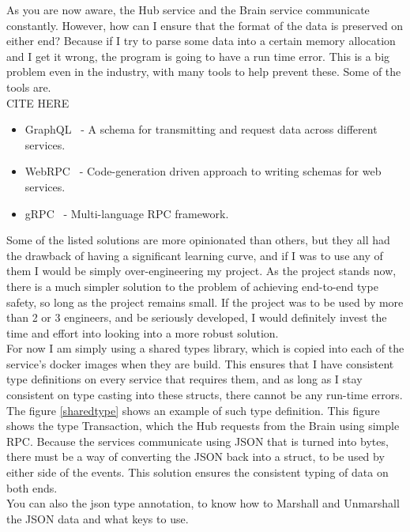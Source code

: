 \documentclass[titlepage]{article}
\begin{document}
As you are now aware, the Hub service and the Brain service communicate constantly. However, how can I ensure that the format of the data is preserved on either end? Because if I try to parse some data into a certain memory allocation and I get it wrong, the program is going to have a run time error. This is a big problem even in the industry, with many tools to help prevent these. Some of the tools are. \\

CITE HERE
\begin{itemize}
  \item GraphQL~\cite{graphql} - A schema for transmitting and request data across different services.
  \item WebRPC~\cite{webrpc} - Code-generation driven approach to writing schemas for web services.
  \item gRPC~\cite{grpc} - Multi-language RPC framework.
\end{itemize}

Some of the listed solutions are more opinionated than others, but they all had the drawback of having a significant learning curve, and if I was to use any of them I would be simply over-engineering my project. As the project stands now, there is a much simpler solution to the problem of achieving end-to-end type safety, so long as the project remains small. If the project was to be used by more than 2 or 3 engineers, and be seriously developed, I would definitely invest the time and effort into looking into a more robust solution. \\

For now I am simply using a shared types library, which is copied into each of the service's docker images when they are build. This ensures that I have consistent type definitions on every service that requires them, and as long as I stay consistent on type casting into these structs, there cannot be any run-time errors. The figure \ref{sharedtype} shows an example of such type definition. This figure shows the type Transaction, which the Hub requests from the Brain using simple RPC. Because the services communicate using JSON that is turned into bytes, there must be a way of converting the JSON back into a struct, to be used by either side of the events. This solution ensures the consistent typing of data on both ends. \\

You can also the json type annotation, to know how to Marshall and Unmarshall the JSON data and what keys to use.
\end{document}
